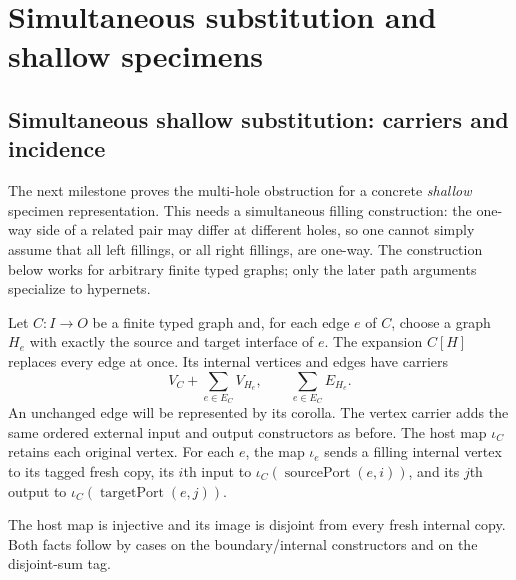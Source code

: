 \section{Simultaneous substitution and shallow specimens}
\label{sec:simultaneous-specimens}

\subsection{Simultaneous shallow substitution: carriers and incidence}
\label{sec:simultaneous}
The next milestone proves the multi-hole obstruction for a concrete
\emph{shallow} specimen representation. This needs a simultaneous filling
construction: the one-way side of a related pair may differ at different
holes, so one cannot simply assume that all left fillings, or all right
fillings, are one-way. The construction below works for arbitrary finite
typed graphs; only the later path arguments specialize to hypernets.

\begin{definition}\label{term:simultaneous-expansion}
Let $C:I\to O$ be a finite typed graph and, for each edge $e$ of $C$, choose
a graph $H_e$ with exactly the source and target interface of $e$.
The expansion $C[H]$ replaces every edge at once. Its internal vertices and
edges have carriers
\[
 V_C+\sum_{e\in E_C}V_{H_e},\qquad \sum_{e\in E_C}E_{H_e}.
\]
An unchanged edge will be represented by its corolla. The vertex carrier
adds the same ordered external input and output constructors as before.
The host map $\iota_C$ retains each original vertex. For each $e$, the map
$\iota_e$ sends a filling internal vertex to its tagged fresh copy, its $i$th
input to $\iota_C(\operatorname{sourcePort}(e,i))$, and its $j$th output to
$\iota_C(\operatorname{targetPort}(e,j))$.
\end{definition}

The host map is injective and its image is disjoint from every fresh internal
copy. Both facts follow by cases on the boundary/internal constructors and
on the disjoint-sum tag.

